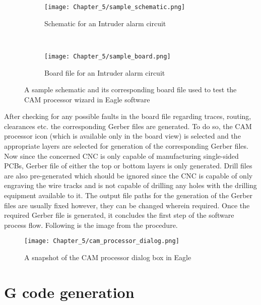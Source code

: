 \begin{figure}[h]
\begin{center}
\hspace{-45mm}
 \begin{subfigure}{0.5\textwidth}
  \texttt{[image: Chapter\_5/sample\_schematic.png]}
  \caption{Schematic for an Intruder alarm circuit} 
  \label{fig:ckt_sch}
 \end{subfigure} \\
 \end{center}
 \begin{center}
 \begin{subfigure}{0.5\textwidth}
  \texttt{[image: Chapter\_5/sample\_board.png]}
  \caption{Board file for an Intruder alarm circuit}
  \label{fig:ckt_brd}
 \end{subfigure} 
\end{center}

 \caption{A sample schematic and its corresponding board file used to test the CAM processor wizard in Eagle software}
 \label{fig:sample_ckt}
\end{figure}


After checking for any possible faults in the board file regarding traces, routing, clearances etc. the corresponding Gerber files are generated. To do so, the CAM processor icon (which is available only in the board view) is selected and the appropriate layers are selected for generation of the corresponding Gerber files. Now since the concerned CNC is only capable of manufacturing single-sided PCBs, Gerber file of either the top or bottom layers is only generated. Drill files are also pre-generated which should be ignored since the CNC is capable of only engraving the wire tracks and is not capable of drilling any holes with the drilling equipment available to it. The output file paths for the generation of the Gerber files are usually fixed however, they can be changed wherein required. Once the required Gerber file is generated, it concludes the first step of the software process flow. Following is the image from the procedure. \pagebreak

\begin{figure}[h]
    \centering
    \texttt{[image: Chapter\_5/cam\_processor\_dialog.png]}
    \caption{A snapshot of the CAM processor dialog box in Eagle}
    \label{fig:cam_dialog}
\end{figure}


\section{G code generation}

